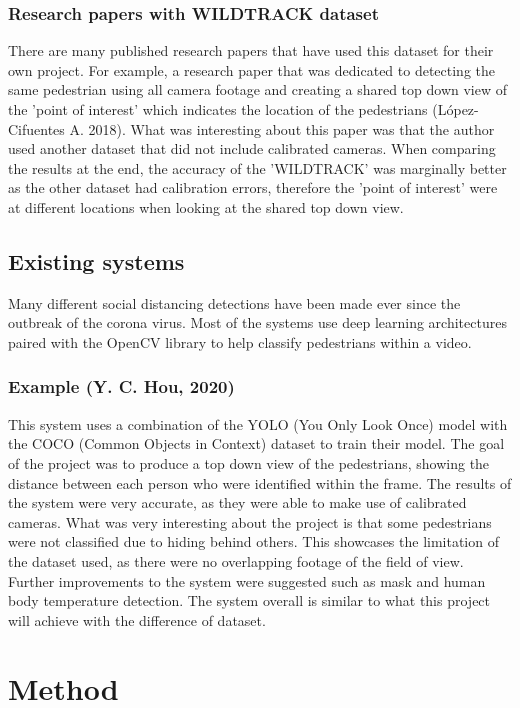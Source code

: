 \documentclass[12pt]{report}
\begin{document}
\subsection{Research papers with WILDTRACK dataset}

There are many published research papers that have used this dataset for their own project. For example, a research paper that was dedicated to detecting the same pedestrian using all camera footage and creating a shared top down view of the 'point of interest' which indicates the location of the pedestrians (López-Cifuentes A. 2018). What was interesting about this paper was that the author used another dataset that did not include calibrated cameras. When comparing the results at the end, the accuracy of the 'WILDTRACK' was marginally better as the other dataset had calibration errors, therefore the 'point of interest' were at different locations when looking at the shared top down view.


\section{Existing systems}

Many different social distancing detections have been made ever since the outbreak of the corona virus. Most of the systems use deep learning architectures paired with the OpenCV library to help classify pedestrians within a video.

\subsection{Example (Y. C. Hou, 2020)}

This system uses a combination of the YOLO (You Only Look Once) model with the COCO (Common Objects in Context) dataset to train their model. The goal of the project was to produce a top down view of the pedestrians, showing the distance between each person who were identified within the frame. The results of the system were very accurate, as they were able to make use of calibrated cameras. What was very interesting about the project is that some pedestrians were not classified due to hiding behind others. This showcases the limitation of the dataset used, as there were no overlapping footage of the field of view. Further improvements to the system were suggested such as mask and human body temperature detection. The system overall is similar to what this project will achieve with the difference of dataset.

\chapter{Method}
\end{document}
